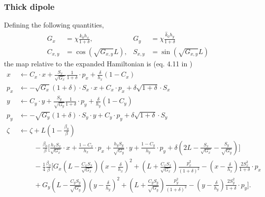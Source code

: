 


\subsubsection{Thick dipole}
Defining the following quantities,
\begin{align}
  G_x&= \chi \frac{k_0 h_x}{1+\delta}, & G_y&= \chi \frac{ \hat k_0 h_y}{1+\delta} \\
  C_{x,y}&=\cos(\sqrt{G_{x,y}}L), & S_{x,y}&=\sin(\sqrt{G_{x,y}}L)
\end{align}
the map relative to the expanded Hamiltonian is (eq. 4.11 in \cite{barber87})
\begin{align}
  x   &\leftarrow C_x \cdot x + \frac{S_x}{\sqrt{G_x}}\frac{1}{1+\delta} \cdot p_x + \frac{\delta}{h_x} (1 - C_x) \\
  p_x &\leftarrow -\sqrt{G_x} (1+\delta) \cdot S_x \cdot x + C_x \cdot p_x + \delta \sqrt{1+\delta} \cdot S_x \\
  y   &\leftarrow C_y \cdot y + \frac{S_y}{\sqrt{G_y}}\frac{1}{1+\delta} \cdot p_y + \frac{\delta}{h_y} (1 - C_y) \\
  p_y &\leftarrow -\sqrt{G_y} (1+\delta) \cdot S_y \cdot y + C_y \cdot p_y + \delta \sqrt{1+\delta} \cdot S_y \\
  \zeta &\leftarrow \zeta + L\left(1 - \frac{\beta_0}{\beta}\right) \\
  & \qquad\, -\frac{\beta_0}{\beta} \Bigg[ \frac{h_x S_x}{\sqrt{G_x}} \cdot x + \frac{1-C_x}{h_x} \cdot p_x
  + \frac{h_y S_y}{\sqrt{G_y}} \cdot y + \frac{1-C_y}{h_y} \cdot p_y
  + \delta \left(2L - \frac{S_x}{\sqrt{G_x}} - \frac{S_y}{\sqrt{G_y}} \right) \Bigg] \\
  & \qquad\, - \frac{1}{4}\frac{\beta_0}{\beta} \Bigg[ G_x \left(L-\frac{C_xS_x}{\sqrt{G_x}} \right)
  \left(x - \frac{\delta}{h_x}\right)^2
  + \left(L+\frac{C_xS_x}{\sqrt{G_x}} \right) \frac{p_x^2}{(1+\delta)^2}
  -\left(x-\frac{\delta}{h_x}\right) \frac{2S_x^2}{1+\delta} \cdot p_x \\
  & \qquad\, + G_y \left(L-\frac{C_yS_y}{\sqrt{G_y}} \right)
  \left(y - \frac{\delta}{h_y}\right)^2 + \left(L+\frac{C_yS_y}{\sqrt{G_y}}\right) 
  \frac{p_y^2}{(1+\delta)^2}
  -\left(y-\frac{\delta}{h_y}\right)\frac{2S_y^2}{1+\delta} \cdot p_y \Bigg].
\end{align}

